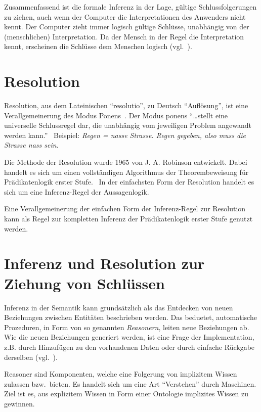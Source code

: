 Zusammenfassend ist die formale Inferenz in der Lage, gültige Schlussfolgerungen zu ziehen, auch wenn der Computer die Interpretationen des Anwenders nicht kennt. Der Computer zieht immer logisch gültige Schlüsse, unabhängig von der (menschlichen) Interpretation. Da der Mensch in der Regel die Interpretation kennt, erscheinen die Schlüsse dem Menschen logisch (vgl.~\cite[S. 165]{russel}).

\section{Resolution}
\label{sec:resolution}

Resolution, aus dem Lateinischen ``resolutio'', zu Deutsch ``Auflösung'', ist eine Verallgemeinerung des Modus Ponens~\cite[S. 279]{russel}. Der Modus ponens ``\ldots stellt eine universelle Schlussregel dar, die unabhängig vom jeweiligen Problem angewandt werden kann.''~\cite[Seite 41]{laemmel} Beispiel: \textit{Regen = nasse Strasse. Regen gegeben, also muss die Strasse nass sein.}

Die Methode der Resolution wurde 1965 von J. A. Robinson entwickelt. Dabei handelt es sich um einen vollständigen Algorithmus der Theorembeweisung für Prädikatenlogik erster Stufe.~\cite[S. 18]{russel} In der einfachsten Form der Resolution handelt es sich um eine Inferenz-Regel der Aussagenlogik.~\cite[S. 277]{russel}

Eine Verallgemeinerung der einfachen Form der Inferenz-Regel zur Resolution kann als Regel zur kompletten Inferenz der Prädikatenlogik erster Stufe genutzt werden.~\cite[S. 278]{russel}

\section{Inferenz und Resolution zur Ziehung von Schlüssen}
\label{sec:inferenz_praktisch}
Inferenz in der Semantik kann grundsätzlich als das Entdecken von neuen Beziehungen zwischen Entitäten beschrieben werden. Das beduetet, automatische Prozeduren, in Form von so genannten \textit{Reasonern}, leiten neue Beziehungen ab. Wie die neuen Beziehungen generiert werden, ist eine Frage der Implementation, z.B. durch Hinzufügen zu den vorhandenen Daten oder durch einfache Rückgabe derselben (vgl.~\cite[Abschnitt 1]{w3inference}).

Reasoner sind Komponenten, welche eine Folgerung von implizitem Wissen zulassen bzw.\ bieten. Es handelt sich um eine Art ``Verstehen'' durch Maschinen. Ziel ist es, aus explizitem Wissen in Form einer Ontologie implizites Wissen zu gewinnen.

